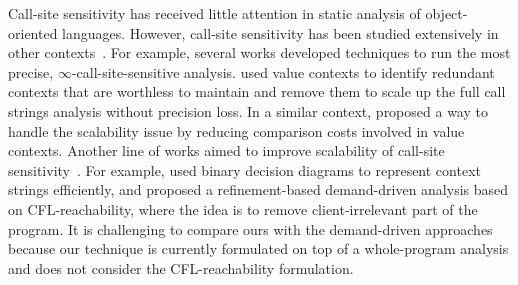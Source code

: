 Call-site sensitivity has received little attention in static analysis of object-oriented languages. 
However, call-site sensitivity has been studied extensively in other contexts~\cite{Thakur2019,Oh2014, Khedker2008,Khedker2012,Zhang2014, Sridharan2006,Sridharan2005,Dan17,Tripp2009}.
For example, several works developed techniques to run the most precise, 
$\infty$-call-site-sensitive analysis.
\cite{Khedker2008} used value contexts to identify 
redundant contexts that are worthless to maintain and remove them
to scale up the full call strings analysis without precision loss.
In a similar context, \cite{Thakur2019} proposed a way to handle the scalability issue by reducing
comparison costs involved in value contexts.
Another line of works aimed to improve scalability of call-site
sensitivity~\cite{Whaley2004,Sridharan2006,Sridharan2005,Dan17,Xu2009}.
For example, \cite{Whaley2004} used binary decision diagrams to represent context strings efficiently, and 
\cite{Sridharan2006} proposed a refinement-based demand-driven
analysis based on CFL-reachability, where the idea is to remove client-irrelevant part of the program.
It is challenging to compare ours with the demand-driven approaches~\cite{Sridharan2006,Boomerang16} because our technique is currently formulated on top of a whole-program analysis and does not consider the CFL-reachability formulation. 

